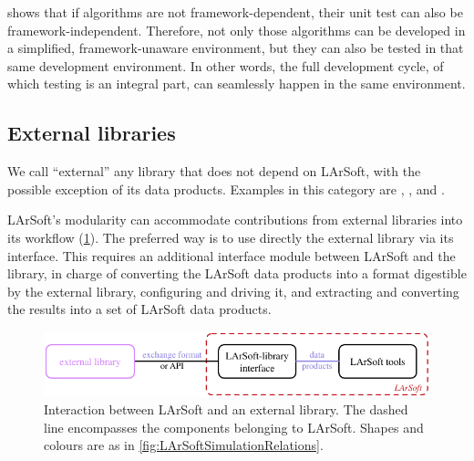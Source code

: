  shows that if algorithms are not
framework-dependent, their unit test can also be framework-independent.
Therefore, not only those algorithms can be developed in a simplified,
framework-unaware environment, but they can also be tested in that same
development environment. In other words, the full development cycle, of
which testing is an integral part, can seamlessly happen in the same
environment.


\subsection{External libraries}
\label{ssec:Development:ExternalLibraries}

We call ``external'' any library that does not depend on LArSoft, with
the possible exception of its data products. Examples in this category
are \GENIE, \GEANT, and \Pandora.

LArSoft's modularity can accommodate contributions from external
libraries into its workflow (\cref{fig:LArSoftAndExternals}). The
preferred way is to use directly the external library via its interface.
This requires an additional interface module between LArSoft and the
library, in charge of converting the LArSoft data products into a format
digestible by the external library, configuring and driving it, and
extracting and converting the results into a set of LArSoft data
products.
\begin{figure}
   \centering
   \includegraphics{figures/LArSoftAndExternalLibrary}
   \caption[Interaction between LArSoft and an external library]{
      \label{fig:LArSoftAndExternals}
      Interaction between LArSoft and an external library.
      The dashed line encompasses the components belonging to LArSoft.
      Shapes and colours are as in \cref{fig:LArSoftSimulationRelations}.
   }
\end{figure}

